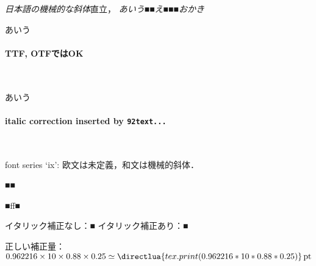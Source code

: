 \documentclass{ltjsarticle}
\begin{document}
\textsl{日本語の機械的な斜体}直立，
\textsl{あいう■\textup{■え■■}■おかき}

{\selectfont あいう}

\paragraph{TTF, OTFではOK}\ 


{\selectfont あいう}

\paragraph{italic correction inserted by {\tt\char92text...}}\

font series `ix': 欧文は未定義，和文は機械的斜体．

{\gt■■}

{\gt■ff■}

イタリック補正なし：{■}
イタリック補正あり：{■}


\bigskip

正しい補正量：$0.962216\times 10 \times 0.88\times 0.25 \simeq
\directlua{tex.print(0.962216*10*0.88*0.25)}\,\textrm{pt}$
\end{document}
